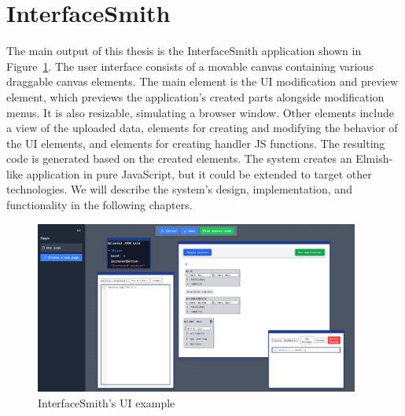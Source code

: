 \section*{InterfaceSmith}
The main output of this thesis is the InterfaceSmith application shown in Figure~\ref{fig:prototype-teaser}.
The user interface consists of a movable canvas containing various draggable canvas elements.
The main element is the UI modification and preview element, which previews the application's created parts alongside modification menus. It is also resizable, simulating a browser window.
Other elements include a view of the uploaded data, elements for creating and modifying the behavior of the UI elements, and elements for creating handler JS functions.
The resulting code is generated based on the created elements. The system creates an Elmish-like application in pure JavaScript, but it could be extended to target other technologies.
We will describe the system's design, implementation, and functionality in the following chapters.
\begin{figure}
	\begin{center}
		\includegraphics[width=0.95\textwidth]{img/UIExample.pdf}
	\end{center}
	\caption{InterfaceSmith's UI example }
	\label{fig:prototype-teaser}
\end{figure}

